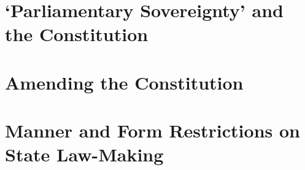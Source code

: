 \section{`Parliamentary Sovereignty' and the Constitution}

\section{Amending the Constitution}

\section{Manner and Form Restrictions on State Law-Making}